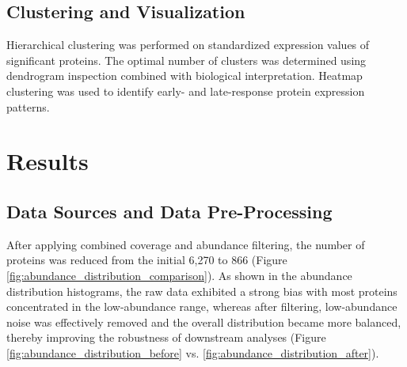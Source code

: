 \documentclass{article}
\begin{document}
    \subsection{Clustering and Visualization}

      Hierarchical clustering was performed on standardized expression values of significant proteins. The optimal number of clusters was determined using dendrogram inspection combined with biological interpretation. Heatmap clustering was used to identify early- and late-response protein expression patterns.

  \section{Results}

    \subsection{Data Sources and Data Pre-Processing}

      After applying combined coverage and abundance filtering, the number of proteins was reduced from the initial 6,270 to 866 (Figure \ref{fig:abundance_distribution_comparison}). As shown in the abundance distribution histograms, the raw data exhibited a strong bias with most proteins concentrated in the low-abundance range, whereas after filtering, low-abundance noise was effectively removed and the overall distribution became more balanced, thereby improving the robustness of downstream analyses (Figure \ref{fig:abundance_distribution_before} vs. \ref{fig:abundance_distribution_after}).
      
\end{document}

